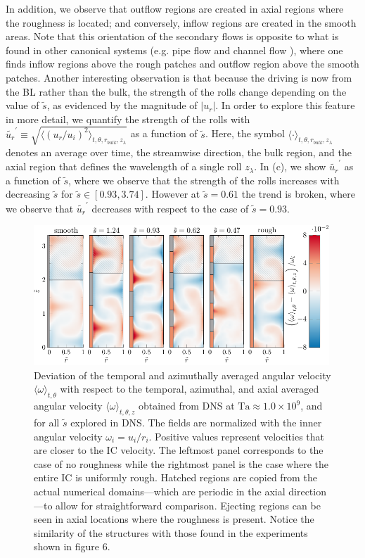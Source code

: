 In addition, we observe that outflow regions are created in axial regions where the roughness is located; and conversely, inflow regions are created in the smooth areas. Note that this  orientation of the secondary flows is opposite to what is found in other canonical systems (e.g. pipe flow and channel flow \citep{Willingham2014, Yang2017, Chung2018}), where one finds inflow regions above the rough patches and outflow region above the smooth patches. Another interesting observation is that because the driving is now from the BL rather than the bulk, the strength of the rolls change depending on the value of $\tilde{s}$, as evidenced by the magnitude of $|u_r|$. In order to explore this feature in more detail, we quantify the strength of the rolls with $\tilde{u_r}^\prime\equiv \sqrt{\langle (u_r/u_i)^2 \rangle_{t,\theta,r_{bulk},z_\lambda}}$ as a function of $\tilde{s}$. Here, the symbol $\langle \cdot \rangle_{t,\theta,r_{bulk},z_\lambda}$ denotes an average over time, the streamwise direction, the bulk region, and the axial region that defines the wavelength of a single roll $z_\lambda$. In (c), we show $\tilde{u_r}^\prime$ as a function of $\tilde{s}$, where we observe that the strength of the rolls increases with decreasing $\tilde{s}$ for $\tilde{s}\in[0.93,3.74]$. However at $\tilde{s}=0.61$ the trend is broken, where we observe that $\tilde{u_r}^\prime$ decreases with respect to the case of $\tilde{s}=0.93$.

\begin{figure}
\centering
\includegraphics[width=0.99\textwidth]{fig6_simPlumes.pdf}
\caption{Deviation of the temporal and azimuthally averaged angular velocity $\langle \omega \rangle_{t,\theta}$ with respect to the temporal, azimuthal, and axial averaged angular velocity $\langle \omega \rangle_{t,\theta,z}$ obtained from DNS at $\text{Ta}\approx 1.0\times 10^{9}$, and for all $\tilde{s}$ explored in DNS. The fields are normalized with the inner angular velocity $\omega_i=u_i/r_i$. Positive values represent velocities that are closer to the IC velocity. The leftmost panel corresponds to the case of no roughness while the rightmost panel is the case where the entire IC is uniformly rough. Hatched regions are copied from the actual numerical domains---which are periodic in the axial direction---to allow for straightforward comparison. Ejecting regions can be seen in axial locations where the roughness is present. Notice the similarity of the structures with those found in the experiments shown in figure 6.}
\label{fig:simomega}
\end{figure}

